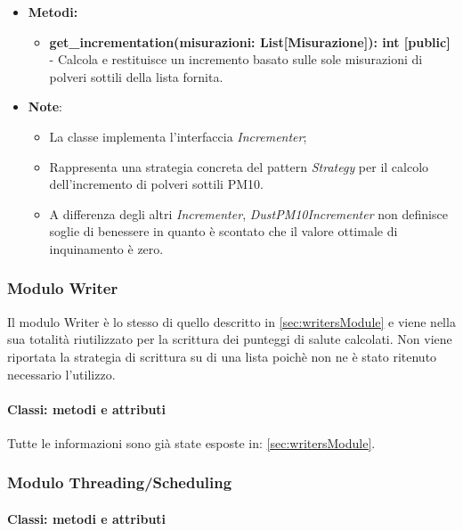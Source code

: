 \begin{itemize}
    \begin{itemize}
    \item \textbf{Metodi: } 
    \begin{itemize}
        \item \textbf{get\_incrementation(misurazioni: List[Misurazione]): int [public]} - Calcola e restituisce un incremento basato sulle sole misurazioni di polveri sottili della lista fornita.
    \end{itemize}
    \item\textbf{Note}:
        \begin{itemize}
            \item La classe implementa l'interfaccia \textit{Incrementer};
            \item Rappresenta una strategia concreta del pattern \textit{Strategy} per il calcolo dell'incremento di polveri sottili PM10.
            \item A differenza degli altri \textit{Incrementer}, \textit{DustPM10Incrementer} non definisce soglie di benessere in quanto è scontato che il valore ottimale di inquinamento è zero.
        \end{itemize}
    \end{itemize}

\end{itemize}

\subsubsection{Modulo Writer}
Il modulo Writer è lo stesso di quello descritto in \ref*{sec:writersModule} e viene nella sua totalità riutilizzato per la scrittura dei punteggi di salute calcolati.
Non viene riportata la strategia di scrittura su di una lista poichè non ne è stato ritenuto necessario l'utilizzo.

\paragraph*{Classi: metodi e attributi}
Tutte le informazioni sono già state esposte in: \ref*{sec:writersModule}.

\subsubsection{Modulo Threading/Scheduling}

\paragraph*{Classi: metodi e attributi}


